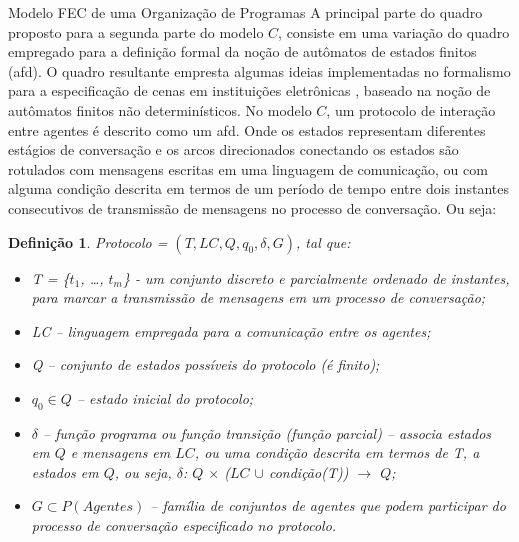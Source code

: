 \begin{section}{Modelo FEC de uma Organização de Programas}
        A principal parte do quadro proposto para a segunda parte do modelo $C$, consiste em uma variação do quadro empregado para a definição formal da noção de autômatos de estados finitos (\acrshort{afd}). O quadro resultante empresta algumas ideias implementadas no formalismo para a especificação de cenas em instituições eletrônicas \cite{vasconcelos2002approach}, baseado na noção de autômatos finitos não determinísticos. No modelo $C$, um protocolo de interação entre agentes é descrito como um \acrshort{afd}. Onde os estados representam diferentes estágios de conversação e os arcos direcionados conectando os estados são rotulados com mensagens escritas em uma linguagem de comunicação, ou com alguma condição descrita em termos de um período de tempo entre dois instantes consecutivos de transmissão de mensagens no processo de conversação. Ou seja:
        
        \newtheorem{theorem}{Definição}

        
        \begin{theorem}
            Protocolo = $(T, LC, Q, q_0, \delta, G)$, tal que:
            \begin{itemize}
                \item T = \{$t_1$, \ldots, $t_m$\} - um conjunto discreto e parcialmente ordenado de instantes, para marcar a transmissão de mensagens em um processo de conversação;
                \item LC – linguagem empregada para a comunicação entre os agentes;
                \item Q – conjunto de estados possíveis do protocolo (é finito);
                \item $q_0 \in Q$ – estado inicial do protocolo;
                \item $\delta$ – função programa ou função transição (função parcial) – associa estados em $Q$ e mensagens em $LC$, ou uma condição descrita em termos de T, a estados em $Q$, ou seja, $\delta$: $Q$ $\times$ ($LC$ $\cup$ condição(T)) $\to$ $Q$;
                \item $G \subset P(Agentes)$ – família de conjuntos de agentes que podem participar do processo de conversação especificado no protocolo.
            \end{itemize}
        \end{theorem}
        

\end{section}
